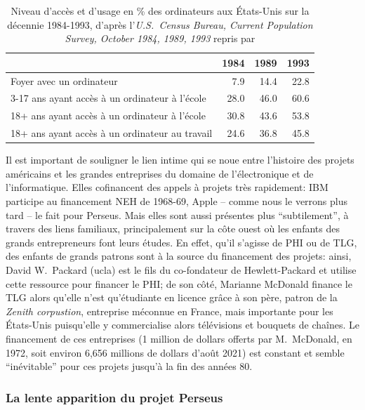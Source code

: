 \begin{table}[ht]
\centering
\begin{tabular}{l|rrr}
                                               & 1984 & 1989 & 1993 \\ \hline  \hline
Foyer avec un ordinateur                       & 7.9  & 14.4 & 22.8 \\ \hline
3-17 ans ayant accès à un ordinateur à l'école & 28.0 & 46.0 & 60.6 \\
18+ ans ayant accès à un ordinateur à l'école  & 30.8 & 43.6 & 53.8 \\
18+ ans ayant accès à un ordinateur au travail & 24.6 & 36.8 & 45.8 \\ \hline
\end{tabular}
\caption{Niveau d'accès et d'usage en \% des ordinateurs aux États-Unis sur la décennie 1984-1993, d'après l'\textit{U.S.~Census Bureau, Current Population Survey, October 1984, 1989, 1993} repris par \cite{kominski1999access}}
\label{tab:computer-ownership}
\end{table}

Il est important de souligner le lien intime qui se noue entre l'histoire des projets américains et les grandes entreprises du domaine de l'électronique et de l'informatique. Elles cofinancent des appels à projets très rapidement: IBM participe au financement NEH de 1968-69, Apple -- comme nous le verrons plus tard -- le fait pour Perseus. Mais elles sont aussi présentes plus \enquote{subtilement}, à travers des liens familiaux, principalement sur la côte ouest où les enfants des grands entrepreneurs font leurs études. En effet, qu'il s'agisse de PHI ou de TLG, des enfants de grands patrons sont à la source du financement des projets: ainsi, David W.~Packard (\acrshort{ucla}) est le fils du co-fondateur de Hewlett-Packard et utilise cette ressource pour financer le PHI; de son côté, Marianne McDonald finance le TLG alors qu'elle n'est qu'étudiante en licence grâce à son père, patron de la \textit{Zenith corpustion}, entreprise méconnue en France, mais importante pour les États-Unis puisqu'elle y commercialise alors télévisions et bouquets de chaînes. Le financement de ces entreprises (1 million de dollars offerts par M.~McDonald, en 1972, soit environ 6,656 millions de dollars d'août 2021) est constant et semble \enquote{inévitable} pour ces projets jusqu'à la fin des années 80.

\subsubsection{La lente apparition du projet Perseus}

